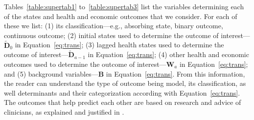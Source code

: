 Tables~\ref{table:supertab1} to~\ref{table:supertab3} list the variables determining each of the states and health and economic outcomes that we consider. For each of these we list: (1) its classification---e.g., absorbing state, binary outcome, continuous outcome; (2) initial states used to determine the outcome of interest---$\tilde{\bm{D}}_0$ in Equation~\eqref{eq:trans}; (3) lagged health states used to determine the outcome of interest---$\tilde{\bm{D}}_{a-1}$ in Equation~\eqref{eq:trans}; (4) other health and economic outcomes used to determine the outcome of interest---$\bm{W}_a$ in Equation~\eqref{eq:trans}; and (5) background variables---$\bm{B}$ in Equation~\eqref{eq:trans}. From this information, the reader can understand the type of outcome being model, its classification, as well determinants and their categorization according with Equation~\eqref{eq:trans}. The outcomes that help predict each other are based on research and advice of clinicians, as explained and justified in \citet{Goldman_etal_2015_Future-Elderly-Model-Report}.

